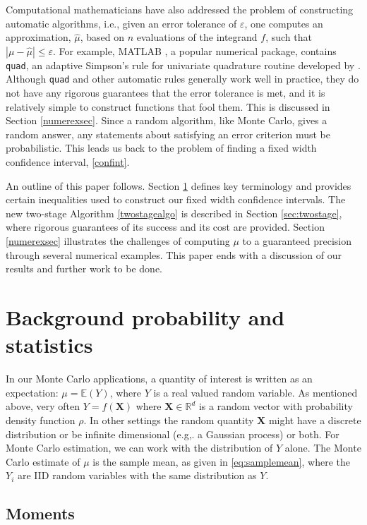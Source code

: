 \documentclass[graybox]{svmult}
\newcommand\real{\mathbb{R}}
\newcommand\e{\mathbb{E}}
\newcommand{\bsX}{\boldsymbol{X}}
\newcommand{\abs}[1]{\left|#1\right|}
\newcommand{\hmu}{\hat{\mu}}
\def\abs#1{\ensuremath{\left \lvert #1 \right \rvert}}
\begin{document}
Computational mathematicians have also addressed the problem of constructing automatic algorithms, i.e., given an error tolerance of $\varepsilon$, one computes an approximation, $\hmu$, based on $n$ evaluations of the integrand $f$, such that $\abs{\mu-\hmu} \le \varepsilon$. For example, MATLAB \citep{MAT7.12}, a popular numerical package, contains {\tt quad}, an adaptive Simpson's rule for univariate quadrature routine developed by \cite{GanGau00a}. Although {\tt quad} and other automatic rules generally work well in practice, they do not have any rigorous guarantees that the error tolerance is met, and it is relatively simple to construct functions that fool them.  This is discussed in Section \ref{numerexsec}.  Since a random algorithm, like Monte Carlo, gives a random answer, any statements about satisfying an error criterion must be probabilistic.  This leads us back to the problem of finding a fixed width confidence interval, \eqref{confint}.

An outline of this paper follows. Section \ref{sec:background} defines key terminology and provides certain inequalities used to construct our fixed width confidence intervals.  The new two-stage Algorithm \ref{twostagealgo} is described in Section \ref{sec:twostage}, where rigorous guarantees of its success and its cost are provided.  Section \ref{numerexsec} illustrates the challenges of computing $\mu$ to a guaranteed precision through several numerical examples.  This paper ends with a discussion of our results and further work to be done.

\section{Background probability and statistics}\label{sec:background}

In our Monte Carlo applications, a quantity of interest
is written as an expectation: $\mu = \e(Y)$, where $Y$
is a real valued random variable.  As mentioned above, very often
$Y = f(\bsX)$ where $\bsX\in\real^d$ is a random vector
with probability density function $\rho$. In other settings the random quantity $\bsX$ might
have a discrete distribution or be infinite dimensional (e.g,. a Gaussian
process) or both. For Monte Carlo estimation, we can
work with the distribution of $Y$ alone. The Monte Carlo estimate of $\mu$ is the sample mean, as given in \eqref{eq:samplemean}, where the $Y_i$ are IID random variables with the same distribution as $Y$.

\subsection{Moments}
\end{document}
